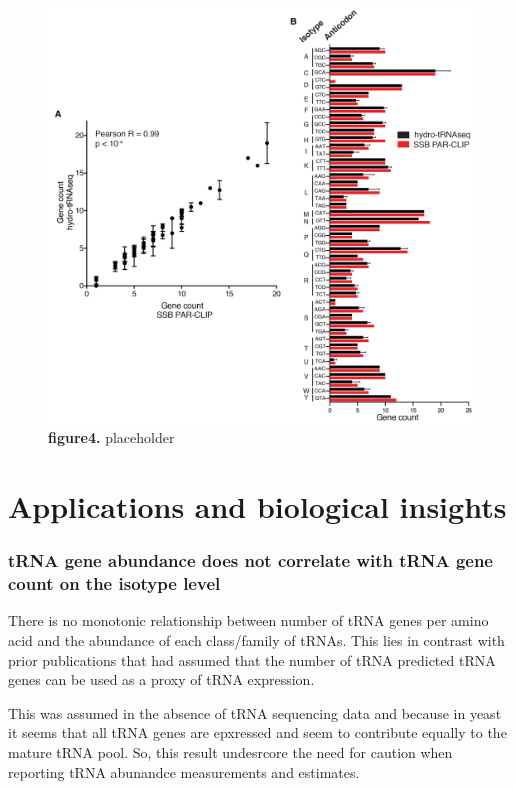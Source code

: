 \documentclass[12pt]{rockefeller}
\begin{document}
\begin{figure}[!ht]%
\centering
\includegraphics[width=\textwidth]{paper4_two.png}%
\caption[figure4]
{\textbf{figure4.}
placeholder}
\centering
\label{paper4}%
\end{figure}

\section{Applications and biological insights}

\subsubsection{tRNA gene abundance does not correlate with tRNA gene count on the isotype level}

There is no monotonic relationship between number of tRNA genes per amino acid and the abundance of each class/family of tRNAs. This lies in contrast with prior publications that had assumed that the number of tRNA predicted tRNA genes can be used as a proxy of tRNA expression. 

This was assumed in the absence of tRNA sequencing data and because in yeast it seems that all tRNA genes are epxressed and seem to contribute equally to the mature tRNA pool. 
So, this result undesrcore the need for caution when reporting tRNA abunandce measurements and estimates.
\end{document}
